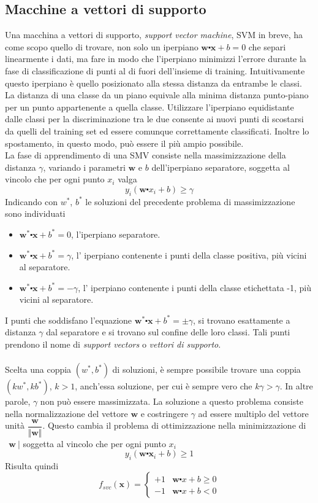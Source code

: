 \documentclass [10pt,a4paper,twoside,openright] {book}
\begin{document}
\subsection{Macchine a vettori di supporto}
Una macchina a vettori di supporto, \textit{support vector machine}, SVM in breve, ha come scopo quello di trovare, non solo un iperpiano $\mathbf{w} \centerdot \mathbf{x} + b = 0$ che separi linearmente i dati, ma fare in modo che l'iperpiano minimizzi l'errore durante la fase di classificazione di punti al di fuori dell'insieme di training. Intuitivamente questo iperpiano è quello posizionato alla stessa distanza da entrambe le classi. La distanza di una classe da un piano equivale alla minima distanza punto-piano per un punto appartenente a quella classe. Utilizzare l'iperpiano equidistante dalle classi per la discriminazione tra le due consente ai nuovi punti di scostarsi da quelli del training set ed essere comunque correttamente classificati. Inoltre lo spostamento, in questo modo, può essere il più ampio possibile.\\
La fase di apprendimento di una SMV consiste nella massimizzazione della distanza $\gamma$, variando i parametri $\mathbf{w}$ e $b$ dell'iperpiano separatore, soggetta al vincolo che per ogni punto $x_i $ valga
\[
y_i(\mathbf{w} \centerdot x_i + b) \geq \gamma
\]
Indicando con $w^*$, $b^*$ le soluzioni del precedente problema di massimizzazione sono individuati
\begin{itemize}
\item
$\mathbf{w^*} \centerdot \mathbf{x} + b^* = 0$, l'iperpiano separatore.
\item
$\mathbf{w^*} \centerdot \mathbf{x} + b^* = \gamma$, l' iperpiano contenente i punti della classe positiva, più vicini al separatore.
\item
$\mathbf{w^*} \centerdot \mathbf{x} + b^* = - \gamma$, l' iperpiano contenente i punti della classe etichettata -1, più vicini al separatore.
\end{itemize}
I punti che soddisfano l'equazione $\mathbf{w^*} \centerdot \mathbf{x} + b^* = \pm \gamma$, si trovano esattamente a distanza $\gamma$ dal separatore e si trovano sul confine delle loro classi. Tali punti prendono il nome di \textit{support vectors} o \textit{vettori di supporto}.\\\\
Scelta una coppia $(w^*, b^*)$ di soluzioni, è sempre possibile trovare una coppia $(kw^*, kb^*)$, $k>1$, anch'essa soluzione, per cui è sempre vero che $k\gamma > \gamma$. In altre parole, $\gamma$ non può essere massimizzata. La soluzione a questo problema consiste nella normalizzazione del vettore $\mathbf{w}$ e costringere $\gamma$ ad essere multiplo del vettore unità $\dfrac{\mathbf{w}}{\Vert \mathbf{w} \Vert}$. Questo cambia il problema di ottimizzazione nella minimizzazione di $\ \: \mathbf{w} \: |$ soggetta al vincolo che per ogni punto $x_i$
\[
y_i(\mathbf{w} \centerdot \mathbf{x}_i + b) \geq 1
\]
Risulta quindi 
\[
f_{svc}(\mathbf{x}) = 
\begin{cases}
+1 & \mathbf{w} \centerdot x + b \geq 0 \\
-1 & \mathbf{w} \centerdot x + b < 0
\end{cases}
\] 
\end{document}
